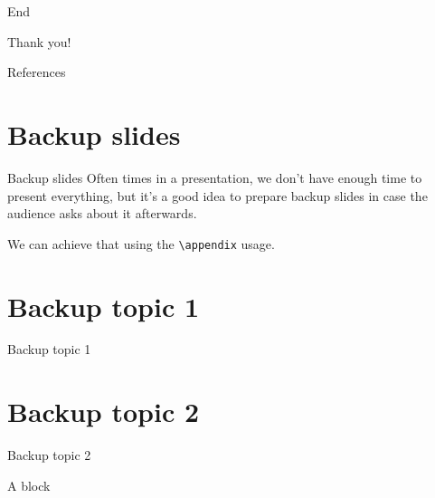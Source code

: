 \documentclass[,aspectratio=43]{beamer}
\begin{document}
\begin{frame}{End}
\protect\hypertarget{end}{}
\centering
\Huge

\textcolor{ubdblue}{Thank you!}
\end{frame}

\begin{frame}{References}
\protect\hypertarget{references}{}
\printbibliography[heading=none]

\appendix
\backupbegin
\end{frame}

\hypertarget{backup-slides}{%
\section{Backup slides}\label{backup-slides}}

\begin{frame}[fragile]{Backup slides}
Often times in a presentation, we don't have enough time to present
everything, but it's a good idea to prepare backup slides in case the
audience asks about it afterwards.\bigskip

We can achieve that using the \texttt{\textbackslash{}appendix} usage.
\end{frame}

\hypertarget{backup-topic-1}{%
\section{Backup topic 1}\label{backup-topic-1}}

\begin{frame}{Backup topic 1}
\lipsum[1]
\end{frame}

\hypertarget{backup-topic-2}{%
\section{Backup topic 2}\label{backup-topic-2}}

\begin{frame}{Backup topic 2}
\begin{block}{A block}
\protect\hypertarget{a-block}{}
\lipsum[4]
\end{block}
\end{frame}



\backupend
\end{document}

